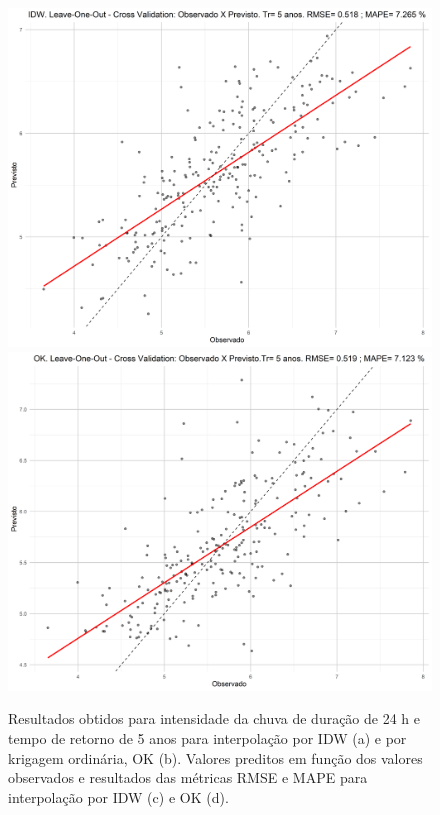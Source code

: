 \documentclass[
]{agujournal2019}
\begin{document}
\begin{figure}
\begin{minipage}{\linewidth}
{}


\end{minipage}%
\newline
\begin{minipage}{\linewidth}
\includegraphics{Figuras/Figura11c.png}
\includegraphics{Figuras/Figura11d.png}\end{minipage}%

\caption{\label{fig-Figura11}Resultados obtidos para intensidade da
chuva de duração de 24 h e tempo de retorno de 5 anos para interpolação
por IDW (a) e por krigagem ordinária, OK (b). Valores preditos em função
dos valores observados e resultados das métricas RMSE e MAPE para
interpolação por IDW (c) e OK (d).}

\end{figure}%
\end{document}

